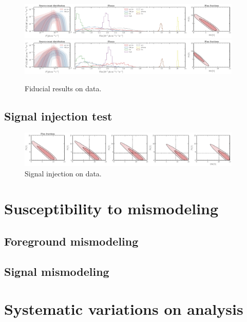 \documentclass[prd,aps,10pt,nofootinbib,twocolumn,superscriptaddress,preprintnumbers,balancelastpage,longbibliography]{revtex4-1}
\begin{document}
%
\begin{figure}
    \centering
    \includegraphics[width=0.95\textwidth]{plots/data_fid_sbi.pdf}
    \includegraphics[width=0.95\textwidth]{plots/data_fid_nptf.pdf}
    \caption{Fiducial results on data.}
    \label{fig:fid_data}
\end{figure}
%

\subsection{Signal injection test}
\label{sec:sig-injection}

%
\begin{figure}
    \centering
    \includegraphics[width=0.95\textwidth]{plots/data_sig_inj.pdf}
    \caption{Signal injection on data.}
    \label{fig:sig_inj_data}
\end{figure}
%

\section{Susceptibility to mismodeling}
\label{sec:mismodeling}

\subsection{Foreground mismodeling}
\label{sec:fg-mismodeling}

\subsection{Signal mismodeling}
\label{sec:sig-mismodeling}

\section{Systematic variations on analysis}
\label{sec:systematics}
\end{document}
